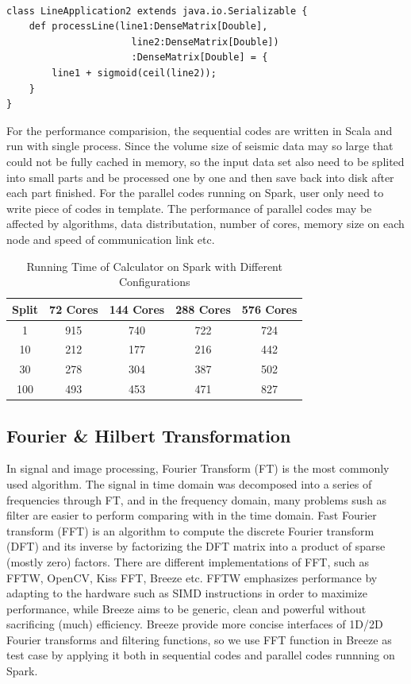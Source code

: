 \lstset{language=Java,frame=single}
\begin{lstlisting}[float,caption=Sample codes of arighmetic operations on two datasets,label=ScalaCode2Line]

class LineApplication2 extends java.io.Serializable {
    def processLine(line1:DenseMatrix[Double],
                      line2:DenseMatrix[Double])
                      :DenseMatrix[Double] = {
        line1 + sigmoid(ceil(line2)); 
    }
}
\end{lstlisting}

For the performance comparision, the sequential codes are written in Scala and run with single process. Since the volume size of seismic data may so large that could not be fully cached in memory, so the input data set also need to be splited into small parts and be processed one by one and then save back into disk after each part finished. For the parallel codes running on Spark, user only need to write piece of codes in template. The performance of parallel codes may be affected by algorithms, data distributation, number of cores, memory size on each node and speed of communication link etc. 


\begin{table}[H]
\caption{Running Time of Calculator on Spark with Different Configurations}
\centering
\begin{tabular}{||c| c c c c ||} 
 \hline
 Split & 72 Cores & 144 Cores & 288 Cores & 576 Cores \\ [0.5ex] 
 \hline
 1 & 915 & 740 & 722 & 724 \\ 
 10 & 212 & 177 & 216 & 442 \\
 30 & 278 & 304 & 387 & 502 \\
 100 & 493 & 453 & 471 & 827 \\
 \hline
\end{tabular}
\label{table:CalcSpark}
\end{table}


\subsection{Fourier \& Hilbert Transformation}
In signal and image processing, Fourier Transform (FT) is the most commonly used algorithm. The signal in time domain was decomposed into a series of frequencies  through FT, and in the frequency domain, many problems sush as filter are easier to perform comparing with in the time domain. Fast Fourier transform (FFT) \cite{FFTWiki} is an algorithm to compute the discrete Fourier transform (DFT) and its inverse by factorizing the DFT matrix into a product of sparse (mostly zero) factors. There are different implementations of FFT, such as FFTW, OpenCV, Kiss FFT, Breeze etc. FFTW\cite{FFTW05} emphasizes performance by adapting to the hardware such as SIMD instructions in order to maximize performance, while Breeze aims to be generic, clean and powerful without sacrificing (much) efficiency. Breeze provide more concise interfaces of 1D/2D Fourier transforms and filtering functions, so we use FFT function in Breeze as test case by applying it both in sequential codes and parallel codes runnning on Spark.     

